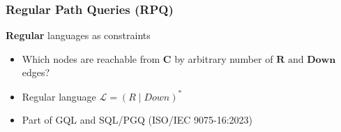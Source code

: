 \documentclass[xcolor=table,aspectratio=169]{beamer}
\begin{document}
\begin{frame}[fragile] \frametitle{Regular Path Queries (RPQ)}
      \begin{minipage}[m]{0.45\linewidth}
  \end{minipage}\hfill
  \begin{minipage}[m]{0.5\linewidth}
  \textbf{Regular} languages as constraints

  \vfill


  \begin{itemize}
        \item Which nodes are reachable from \textbf{C} by arbitrary number of $\textbf{R} \text{ and } \textbf{Down}$ edges?
        \item Regular language $\mathcal{L} = (\textit{R} \mid \textit{Down})^*$
  \end{itemize}
  \vspace{2cm}
  \begin{itemize}    
    \item Part of GQL and SQL/PGQ (ISO/IEC 9075-16:2023)
  \end{itemize}

  \end{minipage}

\end{frame}
\end{document}
